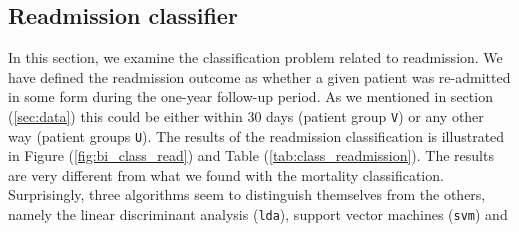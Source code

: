 \documentclass[../thesis.tex]{subfiles}
\begin{document}
\subsection{Readmission classifier}

\noindent In this section, we examine the classification problem related to readmission. We have defined the readmission outcome as whether a given patient was re-admitted in some form during the one-year follow-up period. As we mentioned in section (\ref{sec:data}) this could be either within 30 days (patient group \texttt{V}) or any other way (patient groups \texttt{U}). The results of the readmission classification is illustrated in Figure (\ref{fig:bi_class_read}) and Table (\ref{tab:class_readmission}). The results are very different from what we found with the mortality classification. Surprisingly, three algorithms seem to distinguish themselves from the others, namely the linear discriminant analysis (\texttt{lda}), support vector machines (\texttt{svm}) and  

\vspace*{0,25cm}
\end{document}
